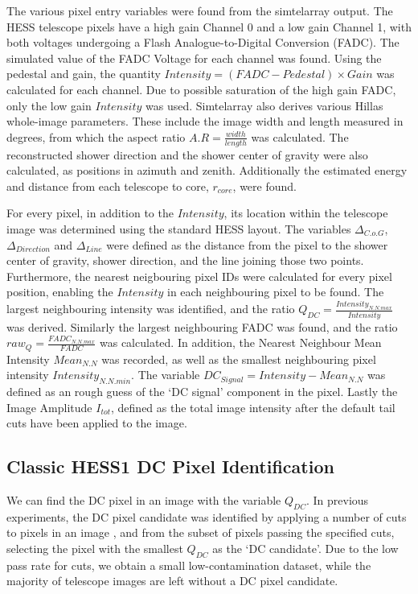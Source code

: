 \documentclass[11pt]{article}
\begin{document}
The various pixel entry variables were found from the sim\textunderscore telarray output. The HESS telescope pixels have a high gain Channel 0 and a low gain Channel 1, with both voltages undergoing a Flash Analogue-to-Digital Conversion (FADC). The simulated value of the FADC Voltage for each channel was found. Using the pedestal and gain, the quantity $Intensity = (FADC - Pedestal)\times Gain $ was calculated for each channel. Due to possible saturation of the high gain FADC, only the low gain $Intensity$ was used. Sim\textunderscore telarray also derives various Hillas whole-image parameters. These include the image width and length measured in degrees, from which the aspect ratio $A.R = \frac{width}{length}$ was calculated. The reconstructed shower direction and the shower center of gravity were also calculated, as positions in azimuth and zenith. Additionally the estimated energy and distance from each telescope to core, $r_{core}$,  were found.

For every pixel, in addition to the $Intensity$, its location within the telescope image was determined using the standard HESS layout. The variables $ \Delta_{C.o.G}$, $\Delta_{Direction}$ and $\Delta_{Line}$ were defined as the distance from the pixel to the shower center of gravity, shower direction, and the line joining those two points. Furthermore, the nearest neigbouring pixel IDs were calculated for every pixel position, enabling the $Intensity$ in each neighbouring pixel to be found. The largest neighbouring intensity was identified, and the ratio $Q_{DC} = \frac{Intensity_{N.N.max}}{Intensity}$ was derived. Similarly the largest neighbouring FADC was found, and the ratio $raw_{Q} = \frac{FADC_{N.N.max}}{FADC}$ was calculated. In addition, the Nearest Neighbour Mean Intensity $Mean_{N.N}$ was recorded, as well as the smallest neighbouring pixel intensity $Intensity_{N.N.min}$. The variable $DC_{Signal} = Intensity-Mean_{N.N}$ was defined as an rough guess of the \textquoteleft DC signal' component in the pixel. Lastly the Image Amplitude $I_{tot}$, defined as the total image intensity after the default tail cuts have been applied to the image.

\subsection{Classic HESS1 DC Pixel Identification}
We can find the DC pixel in an image with the variable $Q_{DC}$. In previous experiments, the DC pixel candidate was identified by applying a number of cuts to pixels in an image \cite{hess07}, and from the subset of pixels passing the specified cuts, selecting the pixel with the smallest $Q_{DC}$ as the \textquoteleft DC candidate'. Due to the low pass rate for cuts, we obtain a small low-contamination dataset, while the majority of telescope images are left without a DC pixel candidate. 
\end{document}
